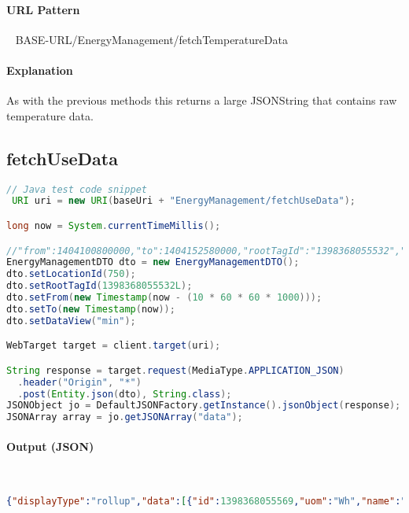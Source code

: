 \documentclass[
10pt, %
letterpaper, %
oneside, %
headinclude,footinclude, %
BCOR5mm, %
]{scrartcl}
\begin{document}
\paragraph{URL Pattern} 
~\newline
BASE-URL/EnergyManagement/fetchTemperatureData

\paragraph{Explanation} As with the previous methods this returns a large JSONString that contains raw temperature data.


\subsection{\textbf{fetchUseData}}

\begin{lstlisting}[language=Java]
// Java test code snippet
 URI uri = new URI(baseUri + "EnergyManagement/fetchUseData");        

long now = System.currentTimeMillis();

//"from":1404100800000,"to":1404152580000,"rootTagId":"1398368055532","locationId":750
EnergyManagementDTO dto = new EnergyManagementDTO();
dto.setLocationId(750);
dto.setRootTagId(1398368055532L);
dto.setFrom(new Timestamp(now - (10 * 60 * 60 * 1000)));
dto.setTo(new Timestamp(now));
dto.setDataView("min");

WebTarget target = client.target(uri);

String response = target.request(MediaType.APPLICATION_JSON)
  .header("Origin", "*")
  .post(Entity.json(dto), String.class);
JSONObject jo = DefaultJSONFactory.getInstance().jsonObject(response);
JSONArray array = jo.getJSONArray("data");
\end{lstlisting}

\paragraph{Output (JSON)} ~
\begin{lstlisting}[language=json]
{"displayType":"rollup","data":[{"id":1398368055569,"uom":"Wh","name":"Refrigeration","value":"2247339","isTag":true},{"id":1398368055538,"uom":"Wh","name":"HVAC","value":"609211","isTag":true},{"id":1398368055550,"uom":"Wh","name":"Lighting","value":"451544","isTag":true},{"id":1398368055554,"uom":"Wh","name":"Mixed Use","value":"303588","isTag":true},{"id":1398368055533,"uom":"Wh","name":"Food Prep","value":"292844","isTag":true},{"id":1398368055557,"uom":"Wh","name":"Other","value":"71193","isTag":true}]}
\end{lstlisting}
\end{document}
